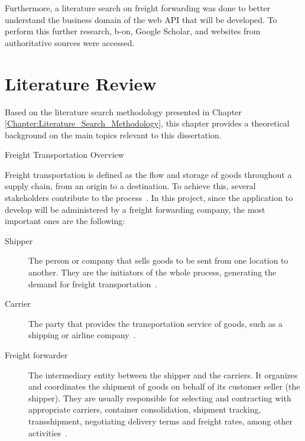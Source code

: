\documentclass[12pt, reqno]{amsbook}
\makeatletter
\def\section{\@startsection{section}{1}%
      \z@{.5\linespacing\@plus.7\linespacing}{.25\linespacing}%
      {\normalfont\bfseries\flushleft}}
\theoremstyle{definition}
\theoremstyle{definition}
\numberwithin{section}{chapter}
\numberwithin{table}{chapter}
\numberwithin{figure}{chapter}
\makeatother
\begin{document}
Furthermore, a literature search on freight forwarding was done to better understand the business domain of the web API that will be developed. To perform this further research, b-on, Google Scholar, and websites from authoritative sources were accessed.

\chapter{Literature Review}
\label{Chapter:Literature_Review}

Based on the literature search methodology presented in Chapter \ref{Chapter:Literature_Search_Methodology}, this chapter provides a theoretical background on the main topics relevant to this dissertation.

\section{Freight Transportation Overview}
\label{Section:Freight_Transportation_Overview}

Freight transportation is defined as the flow and storage of goods throughout a supply chain, from an origin to a destination. To achieve this, several stakeholders contribute to the process~\cite{Song2021, Huber2021}. In this project, since the application to develop will be administered by a freight forwarding company, the most important ones are the following:

\begin{description}
  \item [Shipper] The person or company that sells goods to be sent from one location to another. They are the initiators of the whole process, generating the demand for freight transportation~\cite{Song2021}.
  \item [Carrier] The party that provides the transportation service of goods, such as a shipping or airline company~\cite{Song2021}.
  \item [Freight forwarder] The intermediary entity between the shipper and the carriers. It organizes and coordinates the shipment of goods on behalf of its customer seller (the shipper). They are usually responsible for selecting and contracting with appropriate carriers, container consolidation, shipment tracking, transshipment, negotiating delivery terms and freight rates, among other activities~\cite{Song2021, Huang2019}.
\end{description}
\end{document}
